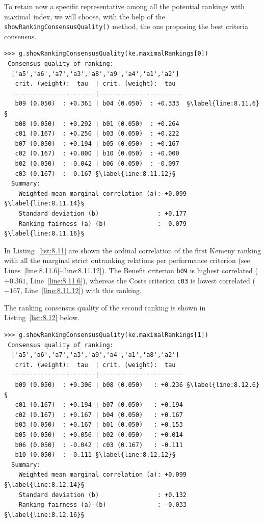 To retain now a specific representative among all the potential rankings with maximal \Kemeny index, we will choose, with the help of the \texttt{showRankingCon\-sensus\-Quality()} method, the one proposing the best criteria consensus.
\begin{lstlisting}[caption={Computing the consensus quality of the first \Kemeny ranking},label=list:8.11,basicstyle=\ttfamily\scriptsize]   
>>> g.showRankingConsensusQuality(ke.maximalRankings[0])
 Consensus quality of ranking:
  ['a5','a6','a7','a3','a8','a9','a4','a1','a2']
   crit. (weight):  tau  | crit. (weight):  tau 
  -----------------------|-----------------------
   b09 (0.050)  : +0.361 | b04 (0.050)  : +0.333  §\label{line:8.11.6}§
   b08 (0.050)  : +0.292 | b01 (0.050)  : +0.264
   c01 (0.167)  : +0.250 | b03 (0.050)  : +0.222
   b07 (0.050)  : +0.194 | b05 (0.050)  : +0.167
   c02 (0.167)  : +0.000 | b10 (0.050)  : +0.000
   b02 (0.050)  : -0.042 | b06 (0.050)  : -0.097
   c03 (0.167)  : -0.167 §\label{line:8.11.12}§
  Summary:
    Weighted mean marginal correlation (a): +0.099 §\label{line:8.11.14}§
    Standard deviation (b)                : +0.177
    Ranking fairness (a)-(b)              : -0.079 §\label{line:8.11.16}§
  \end{lstlisting}

In Listing~\vref{list:8.11}  are shown the ordinal correlation of the first Kemeny ranking  with all the marginal strict outranking relations per performance criterion (see Lines~\ref{line:8.11.6}--\ref{line:8.11.12}). The Benefit criterion \texttt{b09} is highest correlated ($+0.361$, Line~\ref{line:8.11.6}), whereas the Costs criterion \texttt{c03} is lowest correlated ($-167$, Line~\ref{line:8.11.12}) with this \Kemeny ranking.

The ranking consensus quality of the second \Kemeny ranking is shown in Listing~\ref{list:8.12} below.  
\begin{lstlisting}[caption={Computing the consensus quality of the second \Kemeny ranking},label=list:8.12,basicstyle=\ttfamily\scriptsize]
>>> g.showRankingConsensusQuality(ke.maximalRankings[1])
 Consensus quality of ranking:
  ['a5','a6','a7','a3','a9','a4','a1','a8','a2']
   crit. (weight):  tau  | crit. (weight):  tau 
  -----------------------|-----------------------
   b09 (0.050)  : +0.306 | b08 (0.050)   : +0.236 §\label{line:8.12.6}§
   c01 (0.167)  : +0.194 | b07 (0.050)   : +0.194
   c02 (0.167)  : +0.167 | b04 (0.050)   : +0.167
   b03 (0.050)  : +0.167 | b01 (0.050)   : +0.153
   b05 (0.050)  : +0.056 | b02 (0.050)   : +0.014
   b06 (0.050)  : -0.042 | c03 (0.167)   : -0.111
   b10 (0.050)  : -0.111 §\label{line:8.12.12}§
  Summary:
    Weighted mean marginal correlation (a): +0.099 §\label{line:8.12.14}§
    Standard deviation (b)                : +0.132
    Ranking fairness (a)-(b)              : -0.033 §\label{line:8.12.16}§
\end{lstlisting}

